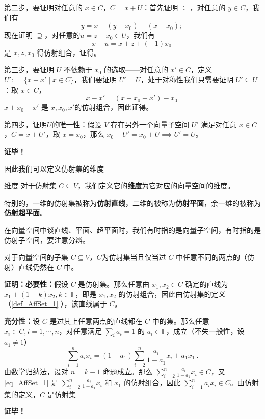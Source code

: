 第二步，要证明对任意的 $x \in C$，$C = x + U$：首先证明 $\subseteq$，对任意的 $y \in C$，我们有
\begin{equation}
y = x + (y - x_0) - (x - x_0); ~
\end{equation}
现在证明 $\supseteq$，对任意的$u  = z - x_0 \in U$，我们有
\begin{equation}
x + u = x + z + (-1) x_0 ~
\end{equation}
是 $x, z, x_0$ 得仿射组合，证得。

第三步，要证明 $U$ 不依赖于 $x_0$ 的选取——对任意的 $x' \in C$，定义 $U': = \{x - x' \mid x \in C\}$，我们要证明 $U' = U$，处于对称性我们只需要证明 $U' \subseteq U$：取 $x \in C$，
\begin{equation}
x - x' = (x + x_0 - x') - x_0 ~
\end{equation}
$x + x_0 - x'$ 是 $x, x_0, x'$的仿射组合，因此证得。

第四步，证明$U$的唯一性：假设 $V$ 存在另外一个向量子空间 $U'$ 满足对任意 $x \in C$，$C = x + U'$，取 $x = x_0$，那么 $x_0 + U' = x_0 + U \implies U' = U$。

\textbf{证毕！}

因此我们可以定义仿射集的维度
\begin{definition}{维度}
对于仿射集 $C \subseteq V$，我们定义它的\textbf{维度}为它对应的向量空间的维度。

特别的，一维的仿射集被称为\textbf{仿射直线}，二维的被称为\textbf{仿射平面}，余一维的被称为\textbf{仿射超平面}。
\end{definition}

在向量空间中谈直线、平面、超平面时，我们有时指的是向量子空间，有时指的是仿射子空间，要注意分辨。

\begin{theorem}{}
对于向量空间的子集 $C \subseteq V$，$C$为仿射集当且仅当过 $C$ 中任意不同的两点的（仿射）直线仍然在 $C$ 中。
\end{theorem}

\textbf{证明：}\textbf{必要性：}假设 $C$ 是仿射集。那么任意由 $x_1,x_2\in C$ 确定的直线为 $x_1+(1-k)x_2,k\in\mathbb F$，即是 $x_1,x_2$ 的仿射组合，因此由仿射集的定义（\autoref{def_AffSet_1} ），该直线属于 $C$。

\textbf{充分性：}设 $C$ 是过其上任意两点的直线都在 $C$ 中的集。那么任意 $x_i\in C,i=1,\cdots ,n$，对任意满足 $\sum_{i}a_i=1$ 的 $a_i\in\mathbb F$，成立（不失一般性，设 $a_1\neq1$）
\begin{equation}\label{eq_AffSet_1}
\sum_{i=1}^n a_ix_i=(1-a_1)\sum_{i=2}^n \frac{a_i}{1-a_1}x_i+a_1x_1~.
\end{equation}
由数学归纳法，设对 $n=k-1$ 命题成立。那么 $\sum_{i=2}^n \frac{a_i}{1-a_1}x_i\in C$，又\autoref{eq_AffSet_1} 是 $\sum_{i=2}^n \frac{a_i}{1-a_1}x_i$ 和 $x_1$ 的仿射组合，因此 $\sum_{i=1}^n a_ix_i\in C$。由仿射集的定义，$C$ 是仿射集




\textbf{证毕！}

